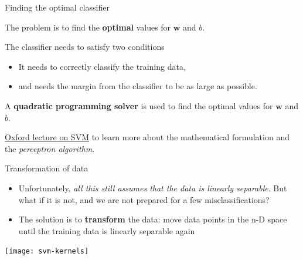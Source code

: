 \documentclass[compress,xcolor=table]{beamer}
\begin{document}
\begin{frame}{Finding the optimal classifier}

The problem is to find the \textbf{optimal} values for $\mathbf{w}$ and
$b$.

The classifier needs to satisfy two conditions

\begin{itemize}

\item It needs to correctly classify the training data,
\item and needs the margin from the classifier to be as large as possible.
\end{itemize}

\pause

A \textbf{quadratic programming solver} is used to find the optimal
values for $\mathbf{w}$ and $b$.

{\footnotesize \href{http://www.robots.ox.ac.uk/~az/lectures/ml/lect2.pdf}{Oxford lecture on SVM} to learn more about the mathematical
    formulation and the \emph{perceptron algorithm}.}

\end{frame}

\begin{frame}{Transformation of data}

\begin{itemize}

    \item Unfortunately, \emph{all this still assumes that the data is linearly
        separable}. But what if it is not, and we are not prepared for a few
  misclassifications?
\item The solution is to \textbf{transform} the data: move data points in
  the n-D space until the training data is linearly separable again
\end{itemize}

    \begin{center}
        \texttt{[image: svm-kernels]}
    \end{center}
\end{frame}
\end{document}
